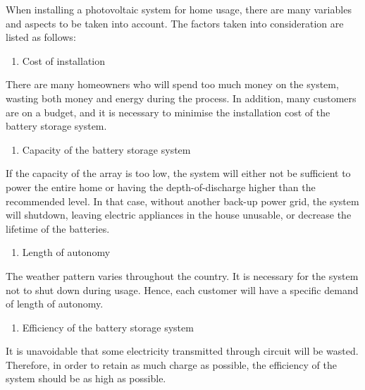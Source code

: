 When installing a photovoltaic system for home usage, there are many variables and aspects to be taken into account. The factors taken into consideration are listed as follows:

\begin{enumerate}
    \item Cost of installation
\end{enumerate}
There are many homeowners who will spend too much money on the system, wasting both money and energy during the process. In addition, many customers are on a budget, and it is necessary to minimise the installation cost of the battery storage system.
\begin{enumerate}[resume]
    \item Capacity of the battery storage system
\end{enumerate}
If the capacity of the array is too low, the system will either not be sufficient to power the entire home or having the depth-of-discharge higher than the recommended level. In that case, without another back-up power grid, the system will shutdown, leaving electric appliances in the house unusable, or decrease the lifetime of the batteries.
\begin{enumerate}[resume]
    \item Length of autonomy
\end{enumerate}
The weather pattern varies throughout the country. It is necessary for the system not to shut down during usage. Hence, each customer will have a specific demand of length of autonomy.
\begin{enumerate}[resume]
    \item Efficiency of the battery storage system
\end{enumerate}
It is unavoidable that some electricity transmitted through circuit will be wasted. Therefore, in order to retain as much charge as possible, the efficiency of the system should be as high as possible.